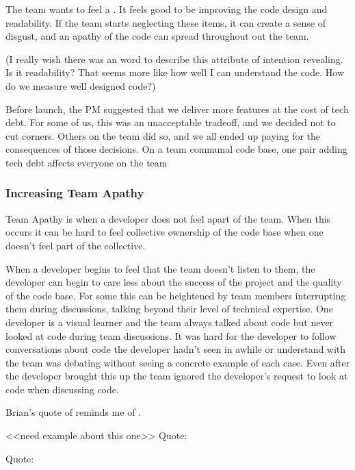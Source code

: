 The team wants to feel a .  It feels good to be improving the code design and readability. If the team starts neglecting these items, it can create a sense of disgust, and an apathy of the code can spread throughout out the team.

(I really wish there was an  word to describe this attribute of intention revealing. Is it readability? That seems more like how well I can understand the code. How do we measure well designed code?)


Before launch, the PM suggested that we deliver more features at the cost of tech debt. For some of us, this was an unacceptable tradeoff, and we decided not to cut corners. Others on the team did so, and we all ended up paying for the consequences of those decisions. On a team communal code base, one pair adding tech debt affects everyone on the team


\subsubsection{Increasing Team Apathy}
Team Apathy is when a developer does not feel apart of the team. When this occurs it can be hard to feel collective ownership of the code base when one doesn't feel part of the collective.

When a developer begins to feel that the team doesn't listen to them, the developer can begin to care less about the success of the project and the quality of the code base. For some this can be heightened by team members interrupting them during discussions, talking beyond their level of technical expertise. One developer is a visual learner and the team always talked about code but never looked at code during team discussions. It was hard for the developer to follow conversations about code the developer hadn't seen in awhile or understand with the team was debating without seeing a concrete example of each case.
Even after the developer brought this up the team ignored the developer's request to look at code when discussing code. 

Brian's quote of  reminds me of . 

<<need example about this one>>
Quote: 

Quote: 

